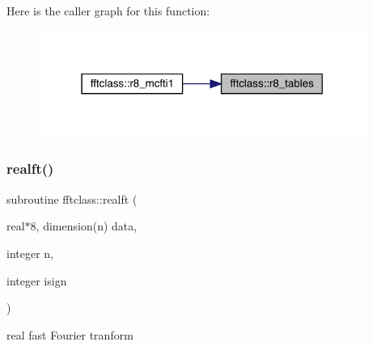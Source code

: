 Here is the caller graph for this function\+:\nopagebreak
\begin{figure}[H]
\begin{center}
\leavevmode
\includegraphics[width=303pt]{namespacefftclass_a68ac2e6dba058989d5e0d7fbee9aa19f_icgraph}
\end{center}
\end{figure}
\mbox{\label{namespacefftclass_a1aec6e8023ec23ff926a64c54c93ee1e}} 
\subsubsection{\texorpdfstring{realft()}{realft()}}
{\footnotesize\ttfamily subroutine fftclass\+::realft (\begin{DoxyParamCaption}\item[{real$\ast$8, dimension(n)}]{data,  }\item[{integer}]{n,  }\item[{integer}]{isign }\end{DoxyParamCaption})}



real fast Fourier tranform 


